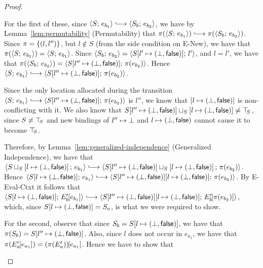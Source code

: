 \begin{proof}
\begin{enumerate}
\begin{enumerate}
\begin{itemize}
          For the first of these, since $\config{S}{e_{b_1}}
          \parstepsto \config{S_b}{e_{b_2}}$, we have by
          Lemma~\ref{lem:permutability} (Permutability) that
          $\pi(\config{S}{e_{b_1}}) \parstepsto
          \pi(\config{S_b}{e_{b_2}})$.  Since $\pi = \left\{(l,
            l'')\right\}$, but $l \notin S$ (from the side condition on {\sc
            E-New}), we have that $\pi(\langle S;\, e_{b_1} \rangle) =
          \langle S;\, e_{b_1} \rangle$. Since $\langle S_b;\, e_{b_2} \rangle =
          \langle S[l' \mapsto (\bot, \textsf{false})];\, l' \rangle$, and $l = l'$, we have
          that $\pi(\langle S_b;\, e_{b_2} \rangle) =
          \langle S[l'' \mapsto (\bot, \textsf{false})];\, \pi(e_{b_2}) \rangle$.  Hence
          $\config{S}{e_{b_1}} \parstepsto
          \config{\extS{S}{l''}{\bot}{\frozenfalse}}{\pi(e_{b_2})}$.

          Since the only location allocated during the transition
          $\config{S}{e_{b_1}} \parstepsto
          \config{\extS{S}{l''}{\bot}{\frozenfalse}}{\pi(e_{b_2})}$ is $l''$, we
          know that $\left[ l \mapsto (\bot, \textsf{false}) \right]$ is
          non-conflicting with it.  We also know that
          $S[l'' \mapsto (\bot, \textsf{false})] \sqcup_{S} \left[ l \mapsto (\bot, \textsf{false}) \right]
          \neq \top\hspace{-0.85mm}_{S}$, since $S \neq \top\hspace{-0.85mm}_{S}$ and new bindings of
          $l'' \mapsto \bot$ and
          $l \mapsto (\bot, \textsf{false})$ cannot cause it to become
          $\top\hspace{-0.85mm}_{S}$.


          Therefore, by Lemma~\ref{lem:generalized-independence}
          (Generalized Independence), we have that
          $\config{\lubstore{S}{\store{\storebinding{l}{\bot}{\frozenfalse}}}}{e_{b_1}}
          \parstepsto
          \config{\lubstore{\extS{S}{l''}{\bot}{\frozenfalse}}{\store{\storebinding{l}{\bot}{\frozenfalse}}}}{\pi(e_{b_2})}$.
          Hence $\config{\extS{S}{l}{\bot}{\frozenfalse}}{e_{b_1}}
          \parstepsto
          \config{\extS{\extS{S}{l''}{\bot}{\frozenfalse}}{l}{\bot}{\frozenfalse}}{\pi(e_{b_2})}$.
          By {\sc E-Eval-Ctxt} it follows that
          $\config{\extS{S}{l}{\bot}{\frozenfalse}}{\evalctxt{E'_b}{e_{b_1}}}
          \parstepsto
          \config{\extS{\extS{S}{l''}{\bot}{\frozenfalse}}{l}{\bot}{\frozenfalse}}{\evalctxt{E'_b}{\pi(e_{b_2})}}$,
          which, since $S[l \mapsto (\bot, \textsf{false})] = S_a$, is
          what we were required to show.

          For the second, observe that since $S_b =
          S[l \mapsto (\bot, \textsf{false})]$, we have that $\pi(S_b) =
          S[l'' \mapsto (\bot, \textsf{false})]$.  Also, since $l$ does not occur in
          $e_{a_1}$, we have that $\pi(E'_a\hspace{-1mm}\left[e_{a_1}\right]) =
          (\pi(E'_a))\hspace{-1mm}\left[e_{a_1}\right]$.  Hence we have to show that


\end{itemize}
\end{enumerate}
\end{enumerate}
\end{proof}
